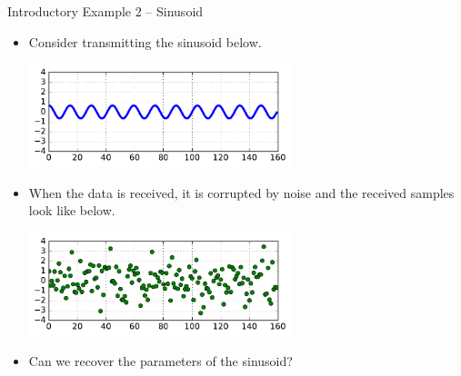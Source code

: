 \documentclass[10pt, aspectratio=169]{beamer} %
\begin{document}
\newcommand{\imagewidth}{0.6\textwidth}
\begin{frame}[allowframebreaks=0.8]{Introductory Example 2 -- Sinusoid}
 \begin{itemize}
\item Consider transmitting the sinusoid below.
\centerline{\includegraphics[width=\imagewidth]{MLSinusoidOrig.pdf}}
\item When the data is received, it is corrupted by noise
 and the received samples look like below.
\centerline{\includegraphics[width=\imagewidth]{MLSinusoidNoisy.pdf}} 
\item Can we recover the parameters of the sinusoid?
\end{itemize}
\end{frame}
\end{document}
